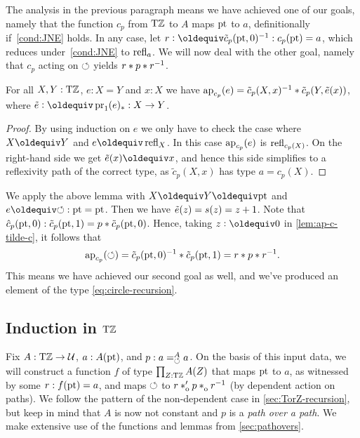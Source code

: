 \documentclass[a4paper,12pt]{amsart}
\begin{document}
The analysis in the previous paragraph
means we have achieved one of our goals,
namely that the function $c_p$ from ${\mathrm{T}\mathbb{Z}}$ to $A$
maps ${\mathord{\mathrm{pt}}}$ to $a$, definitionally if~\cref{cond:JNE} holds.
In any case, let $r \defeq \tilde c_p(\pt,0)^{-1} : c_p(\pt) = a$,
which reduces under~\cref{cond:JNE} to $\mathop{{\mathrm{refl}}_{a}}$.
We will now deal with the other goal,
namely that $c_p$ acting on ${\circlearrowleft}$ yields $r * p * r^{-1}$.

\begin{lemma}\label{lem:ap-c-tilde-c}
For all $X,Y:{\mathrm{T}\mathbb{Z}}$, $e: X=Y$ and $x:X$ we have
$\mathop{{\mathrm{ap}}_{c_p}}(e) = \tilde c_p(X,x)^{-1}* \tilde c_p(Y,\tilde {e}(x))$,
where $\ptoe{e}\defeq \pr_1(e)_* : X\to Y$.
\end{lemma}
\begin{proof}
By using induction on $e$ we only have to check the case where
$X\jdeq Y$ and $e\jdeq\refl{X}$. In this case $\mathop{{\mathrm{ap}}_{c_p}}(e)$ is
$\mathop{{\mathrm{refl}}_{c_p(X)}}$. On the right-hand side we get $\ptoe{e}(x)\jdeq x$,
and hence this side simplifies to a reflexivity path of
the correct type, as $\tilde c_p(X,x)$ has type $a=c_p(X)$.
\end{proof}

We apply the above lemma with $X\jdeq Y\jdeq \pt$ and $e\jdeq{\Zloop}: \pt=\pt$.
Then we have $\tilde {e}(z)=s(z)=z+1$.
Note that $\hat c_p({\mathord{\mathrm{pt}}},0) : \tilde c_p({\mathord{\mathrm{pt}}},1) = p * \tilde c_p({\mathord{\mathrm{pt}}},0)$.
Hence, taking $z\defeq 0$ in \cref{lem:ap-c-tilde-c}, it follows that
\[
  \mathop{{\mathrm{ap}}_{c_p}}({\circlearrowleft}) = \tilde c_p({\mathord{\mathrm{pt}}},0)^{-1} * \tilde c_p({\mathord{\mathrm{pt}}},1)
  = r * p * r^{-1}.
\]
This means we have achieved our second goal as well,
and we've produced an element of the type \eqref{eq:circle-recursion}.

\subsection{Induction in ${\mathrm{T}\mathbb{Z}}$}\label{sec:TorZ-induction}

Fix $A:{\mathrm{T}\mathbb{Z}}\to\mathcal{U}$, $a:A({\mathord{\mathrm{pt}}})$, and $p: a=^A_{{\circlearrowleft}} a$.
On the basis of this input data, we will construct a function $f$ of
type $\prod_{Z:{\mathrm{T}\mathbb{Z}}} A(Z)$ that maps ${\mathord{\mathrm{pt}}}$ to $a$,
as witnessed by some $r : f({\mathord{\mathrm{pt}}}) = a$,
and maps ${\circlearrowleft}$ to $r \ctop p \cto r^{-1}$ (by dependent action on paths).
We follow the pattern of the non-dependent case
in \cref{sec:TorZ-recursion}, but keep in mind that
$A$ is now not constant and $p$ is a \emph{path over a path}.
{We make extensive use of the functions and lemmas from \cref{sec:pathovers}.}
\end{document}
